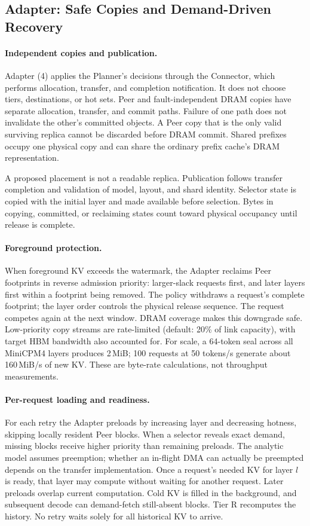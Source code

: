 \subsection{Adapter: Safe Copies and Demand-Driven Recovery}
\label{sec:kv-runtime}

\paragraph{Independent copies and publication.}
Adapter (4) applies the Planner's decisions through the Connector, which
performs allocation, transfer, and completion notification. It does not
choose tiers, destinations, or hot sets. Peer and fault-independent DRAM
copies have separate allocation, transfer, and commit paths. Failure of
one path does not invalidate the other's committed objects. A Peer copy
that is the only valid surviving replica cannot be discarded before
DRAM commit. Shared prefixes occupy one physical copy and can share
the ordinary prefix cache's DRAM representation.

A proposed placement is not a readable replica. Publication follows
transfer completion and validation of model, layout, and shard identity.
Selector state is copied with the initial layer and made available before
selection. Bytes in copying, committed, or reclaiming states count
toward physical occupancy until release is complete.

\paragraph{Foreground protection.}
When foreground KV exceeds the watermark, the Adapter reclaims Peer
footprints in reverse admission priority: larger-slack requests first,
and later layers first within a footprint being removed. The policy
withdraws a request's complete footprint; the layer order controls the
physical release sequence. The request competes again at the next window.
DRAM coverage makes this downgrade safe. Low-priority copy streams are
rate-limited (default: 20\% of link capacity), with target HBM bandwidth
also accounted for. For scale, a 64-token seal across all MiniCPM4 layers
produces 2\,MiB; 100 requests at 50 tokens/s generate about 160\,MiB/s
of new KV. These are byte-rate calculations, not throughput measurements.

\paragraph{Per-request loading and readiness.}
For each retry the Adapter preloads by increasing layer and decreasing
hotness, skipping locally resident Peer blocks. When a selector reveals
exact demand, missing blocks receive higher priority than remaining
preloads. The analytic model assumes preemption; whether an in-flight
DMA can actually be preempted depends on the transfer implementation.
Once a request's needed KV for layer $l$ is ready, that layer may compute
without waiting for another request. Later preloads overlap current
computation. Cold KV is filled in the background, and subsequent decode
can demand-fetch still-absent blocks. Tier R recomputes the history.
No retry waits solely for all historical KV to arrive.

